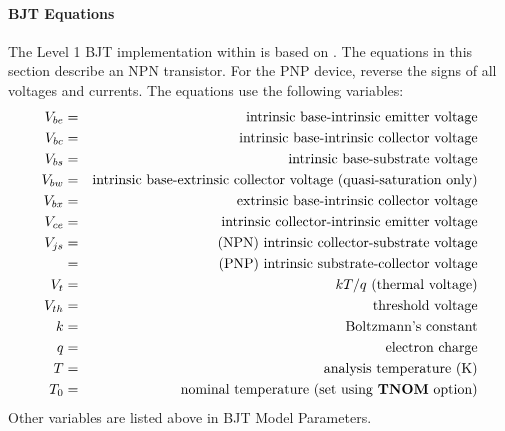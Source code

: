 \paragraph{BJT Equations}\label{bjt_equations}
The Level 1 BJT implementation within \Xyce{} is based on \cite{Fjeldly:1998}.
The equations in this section describe an NPN transistor. For the PNP device,
reverse the signs of all voltages and currents.  The equations use the
following variables:
\begin{eqnarray*}
V_{be} & = & \mbox{intrinsic base-intrinsic emitter voltage} \\
V_{bc} & = & \mbox{intrinsic base-intrinsic collector voltage} \\
V_{bs} & = & \mbox{intrinsic base-substrate voltage} \\
V_{bw} & = & \mbox{intrinsic base-extrinsic collector voltage
(quasi-saturation only)} \\
V_{bx} & = & \mbox{extrinsic base-intrinsic collector voltage} \\
V_{ce} & = & \mbox{intrinsic collector-intrinsic emitter voltage} \\
V_{js} & = & \mbox{(NPN) intrinsic collector-substrate voltage} \\
&        = & \mbox{(PNP) intrinsic substrate-collector voltage} \\
V_{t}  & = & \mbox{$kT/q$ (thermal voltage)} \\
V_{th} & = & \mbox{threshold voltage} \\
k      & = & \mbox{Boltzmann's constant} \\
q      & = & \mbox{electron charge} \\
T      & = & \mbox{analysis temperature (K)} \\
T_{0}  & = & \mbox{nominal temperature (set using \textrm{\textbf{TNOM}} option)}
\end{eqnarray*}
Other variables are listed above in BJT Model Parameters.

